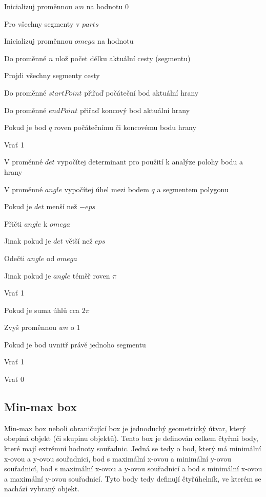 \documentclass{article}
\begin{document}
\begin{spacing}{1.5}
\noindent Inicializuj proměnnou $wn$ na hodnotu 0

\noindent Pro všechny segmenty v $parts$

\indent Inicializuj proměnnou $omega$ na hodnotu

\indent Do proměnné $n$ ulož počet délku aktuální cesty (segmentu)

\indent Projdi všechny segmenty cesty

\indent \indent Do proměnné $startPoint$ přiřaď počáteční bod aktuální hrany

\indent\indent Do proměnné $endPoint$ přiřaď koncový bod aktuální hrany

\indent\indent Pokud je bod $q$ roven počátečnímu či koncovému bodu hrany

\indent\indent\indent Vrať 1

\indent\indent V proměnné $det$ vypočítej determinant pro použití k analýze polohy bodu a hrany

\indent\indent V proměnné $angle$ vypočítej úhel mezi bodem $q$ a segmentem polygonu

\indent\indent\indent Pokud je $det$ menší než $-eps$ 

\indent\indent\indent\indent Přičti $angle$ k $omega$

\indent\indent\indent Jinak pokud je $det$ větší než $eps$

\indent\indent\indent\indent Odečti $angle$ od $omega$

\indent\indent\indent Jinak pokud je $angle$ téměř roven $\pi$

\indent\indent\indent\indent Vrať 1	

\indent Pokud je suma úhlů cca $2\pi$

\indent\indent Zvyš proměnnou $wn$ o 1

\noindent Pokud je bod uvnitř právě jednoho segmentu

\indent Vrať 1

\noindent Vrať 0


\subsection{Min-max box}
Min-max box neboli ohraničující box je jednoduchý geometrický útvar, který obepíná objekt (či skupinu objektů). Tento box je definován celkem čtyřmi body, které mají extrémní hodnoty souřadnic. Jedná se tedy o bod, který má minimální x-ovou a y-ovou souřadnici, bod s maximální x-ovou a minimální y-ovou souřadnicí, bod s maximální x-ovou a y-ovou souřadnicí a bod s minimální x-ovou a maximální y-ovou souřadnicí. Tyto body tedy definují čtyřúhelník, ve kterém se nachází vybraný objekt. 


\end{spacing}
\end{document}
